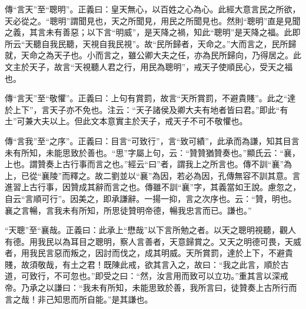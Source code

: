 {\noindent\zhuan{}\fzbyks 傳“言天”至“聰明”。正義曰：皇天無心，以百姓之心為心。此經大意言民之所欲，天必從之。“聰明”謂聞見也，天之所聞見，用民之所聞見也。然則“聰明”直是見聞之義，其言未有善惡；以下言“明威”，是天降之禍，知此“聰明”是天降之福。此即所云“天聽自我民聽，天視自我民視”。故“民所歸者，天命之。”大而言之，民所歸就，天命之為天子也。小而言之，雖公卿大夫之任，亦為民所歸向，乃得居之。此文主於天子，故言“天視聽人君之行，用民為聰明”，戒天子使順民心，受天之福也。 \par}

{\noindent\zhuan{}\fzbyks 傳“言天”至“敬懼”。正義曰：上句有賞罰，故言“天所賞罰，不避貴賤”。此之“達於上下”，言天子亦不免也。注云：“天子諸侯及卿大夫有地者皆曰君。”即此“有土”可兼大夫以上。但此文本意實主於天子，戒天子不可不敬懼也。 \par}

{\noindent\zhuan{}\fzbyks 傳“言我”至“之序”。正義曰：目言“可致行”，言“致可績”，此承而為謙，知其目言未有所知，未能思致於善也。“思”字屬上句，云：“贊贊猶贊奏也。”顯氏云：“襄，上也。謂贊奏上古行事而言之也。”經云“曰”者，謂我上之所言也。傳不訓“襄”為上，已從“襄陵”而釋之。故二劉並以“襄”為因，若必為因，孔傳無容不訓其意。言進習上古行事，因贊成其辭而言之也。傳雖不訓“襄”字，其義當如王說。慮忽之，自云“言順可行”。因美之，即承謙辭。一揚一抑，言之次序也。云：“贊，明也。襄之言暢，言我未有所知，所思徒贊明帝德，暢我忠言而已。謙也。” \par}

{\noindent\shu{}\fzkt “天聰”至“襄哉。正義曰：此承上“懋哉”以下言所勉之者。以天之聰明視聽，觀人有德。用我民以為耳目之聰明，察人言善者，天意歸賞之。又天之明德可畏，天威者，用我民言惡而叛之，因討而伐之，成其明威。天所賞罰，達於上下，不避貴賤，故須敬哉，有土之君！既陳此戒，欲其言入之，故曰：“我之此言，順於古道，可致行，不可忽也。”即受之曰：“然，汝言用而致可以立功。”重其言以深戒帝。乃承之以謙曰：“我未有所知，未能思致於善，我所言曰，徒贊奏上古所行而言之哉！非己知思而所自能。”是其謙也。 \par}

